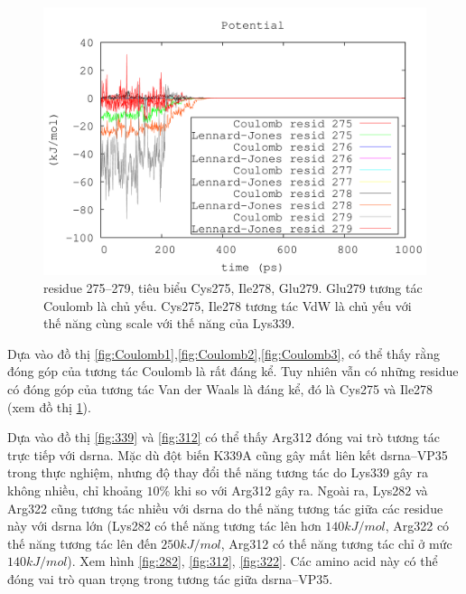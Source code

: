 \documentclass[12pt,a4paper,reqno, oneside]{book}
\begin{document}
\begin{figure}[h]
\begin{center}
\includegraphics[width=1.0\textwidth,natwidth=610,natheight=642]{275-279}
\end{center}
\caption{\gls{residue} 275--279, tiêu biểu Cys275, Ile278, Glu279. Glu279 tương tác Coulomb là chủ yếu. Cys275, Ile278 tương tác VdW là chủ yếu với thế năng cùng scale với thế năng của Lys339.}
\label{fig:VdW}
\end{figure}
Dựa vào đồ thị \ref{fig:Coulomb1},\ref{fig:Coulomb2},\ref{fig:Coulomb3}, có thể thấy rằng đóng góp của tương tác Coulomb là rất đáng kể. Tuy nhiên vẫn có những \gls{residue} có đóng góp của tương tác Van der Waals là đáng kể, đó là Cys275 và Ile278 (xem đồ thị \ref{fig:VdW}).

Dựa vào đồ thị \ref{fig:339} và \ref{fig:312} có thể thấy Arg312 đóng vai trò tương tác trực tiếp với \gls{dsrna}. Mặc dù đột biến \gls{K339A} cũng gây mất liên kết \gls{dsrna}--VP35 trong thực nghiệm, nhưng độ thay đổi thế năng tương tác do Lys339 gây ra không nhiều, chỉ khoảng $10\%$ khi so với Arg312 gây ra. Ngoài ra, Lys282 và Arg322 cũng tương tác nhiều với \gls{dsrna} do thế năng tương tác giữa các \gls{residue} này với \gls{dsrna} lớn (Lys282 có thế năng tương tác lên hơn $140 kJ/mol$, Arg322 có thế năng tương tác lên đến $250 kJ/mol$, Arg312 có thế năng tương tác chỉ ở mức $140 kJ/mol$). Xem hình \ref{fig:282}, \ref{fig:312}, \ref{fig:322}. Các amino acid này có thể đóng vai trò quan trọng trong tương tác giữa \gls{dsrna}--VP35.
\end{document}
